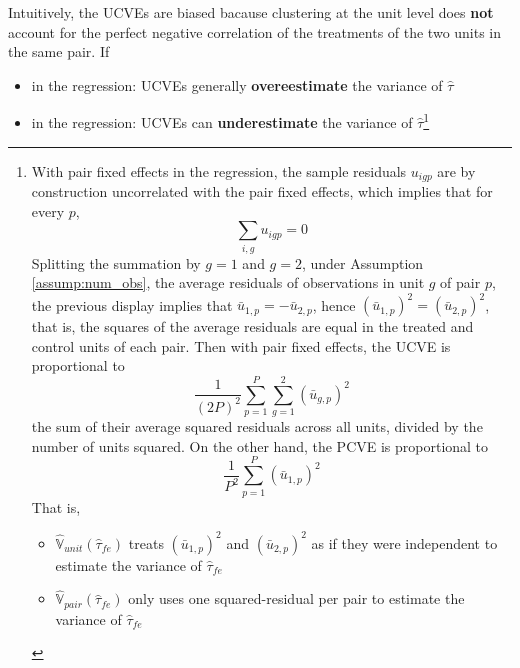 \documentclass[twoside]{article}
\begin{document}
Intuitively, the UCVEs are biased bacause clustering at the unit level does \textbf{not} account for the perfect negative correlation of the treatments of the two units in the same pair. If 
\begin{itemize}
    \item {} in the regression: UCVEs generally \textbf{overeestimate} the variance of $\hat{\tau}$
    \item {} in the regression: UCVEs can \textbf{underestimate} the variance of $\hat{\tau}$\footnote{With pair fixed effects in the regression, the sample residuals $u_{igp}$ are by construction uncorrelated with the pair fixed effects, which implies that for every $p$, $$\sum_{i,g}u_{igp}=0$$ Splitting the summation by $g=1$ and $g=2$, under Assumption \ref{assump:num_obs}, the average residuals of observations in unit $g$ of pair $p$, the previous display implies that $\bar{u}_{1,p}=-\bar{u}_{2,p}$, hence $\left(\bar{u}_{1,p}\right)^2=\left(\bar{u}_{2,p}\right)^2$, that is, the squares of the average residuals are equal in the treated and control units of each pair. Then with pair fixed effects, the UCVE is proportional to $$\frac{1}{\left(2P\right)^2}\sum^P_{p=1}\sum^2_{g=1}\left(\bar{u}_{g,p}\right)^2$$ the sum of their average squared residuals across all units, divided by the number of units squared. On the other hand, the PCVE is proportional to $$ \frac{1}{P^2}\sum^P_{p=1}\left(\bar{u}_{1,p}\right)^2 $$ That is, 
    \begin{itemize} 
        \item $\hat{\mathbb{V}}_{unit}\left(\hat{\tau}_{fe}\right)$ treats $\left(\bar{u}_{1,p}\right)^2$ and $\left(\bar{u}_{2,p}\right)^2$ as if they were independent to estimate the variance of $\hat{\tau}_{fe}$
        \item $\hat{\mathbb{V}}_{pair}\left(\hat{\tau}_{fe}\right)$ only uses one squared-residual per pair to estimate the variance of $\hat{\tau}_{fe}$
    \end{itemize} }
\end{itemize}
\end{document}
